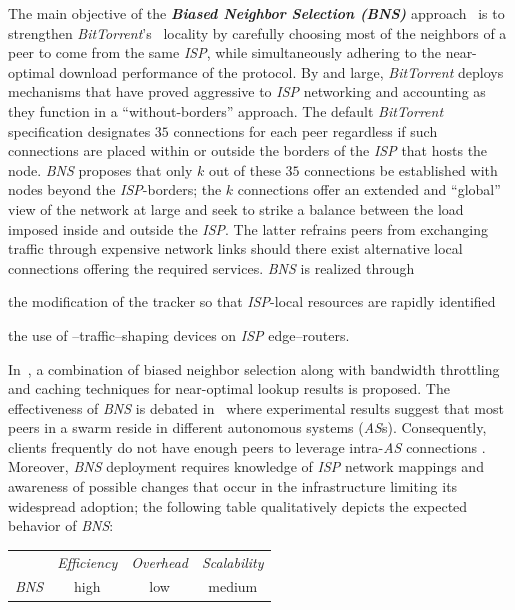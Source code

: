 The main objective of the \textbf{\emph{Biased Neighbor Selection (BNS)}} 
approach~\cite{BCCMSBZ2006} is to 
strengthen \emph{BitTorrent}'s~\cite{c_bittorrent_2003} locality 
by carefully choosing most of the neighbors of a peer to come from 
the same \emph{ISP}, while simultaneously adhering to the near-optimal
download performance of the protocol.
By and large, \emph{BitTorrent} deploys mechanisms that have proved
aggressive to \emph{ISP} networking and accounting as they function 
in a ``without-borders'' approach. 
The default \emph{BitTorrent} specification
designates $35$ connections for each peer regardless if such connections are
placed within or outside the borders of the \emph{ISP} that hosts the node.
\emph{BNS} proposes that only $k$ out of these $35$ connections be
established with nodes beyond the {\it ISP}-borders;
the $k$ connections offer an extended and ``global'' view of 
the network at large and seek to strike a balance between 
the load imposed inside and outside the \emph{ISP}.
The latter refrains peers from exchanging traffic through
expensive network links should there exist alternative local connections
offering the required services. 
\emph{BNS} is realized through 
\begin{inparaenum}[1)]
\item
the modification of the tracker so that 
\emph{ISP}-local resources are rapidly identified
\item
the use of \p--traffic--shaping devices on \emph{ISP} edge--routers. 
\end{inparaenum}
In~\cite{BCCMSBZ2006}, a combination of 
biased neighbor selection along with bandwidth throttling
and caching techniques for near-optimal lookup results is proposed. 
The effectiveness of \emph{BNS} is debated 
in~\cite{RTLCGZ2010} where experimental results suggest that 
most peers in a swarm reside in different autonomous systems (\emph{AS}s).
Consequently, clients frequently do not have enough peers to leverage
intra-\emph{AS} connections \cite{RTLCGZ2010}.
Moreover, \emph{BNS} deployment
requires knowledge of \emph{ISP} network mappings and awareness of possible
changes that occur in the infrastructure limiting its widespread adoption; the
following table qualitatively depicts the expected behavior of \emph{BNS}:
\begin{center}
{\footnotesize
\begin{tabular}{rccc}
\multicolumn{1}{r}{} &
\multicolumn{1}{c}{\emph{Efficiency}} &
\multicolumn{1}{c}{\emph{Overhead}} &
\multicolumn{1}{c}{\emph{Scalability}}
\\
\cline{2-4}
\emph{BNS} &
high &
low &
medium
\end{tabular}
}
\end{center}

